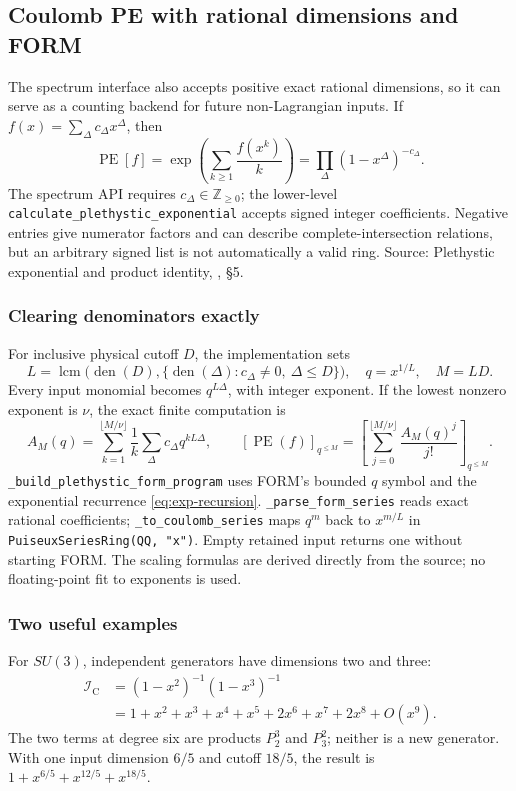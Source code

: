\documentclass[11pt,a4paper]{article}
\numberwithin{equation}{section}
\newcommand{\code}[1]{{\small\nolinkurl{#1}}}
\newcommand{\PE}{\operatorname{PE}}
\newcommand{\CB}{\mathrm C}
\newcommand{\ZZ}{\mathbb Z}
\newcommand{\src}[1]{{\small\color{muted}Source: #1.}\par}
\begin{document}
\clearpage
\subsection{Coulomb PE with rational dimensions and FORM}
The spectrum interface also accepts positive exact rational dimensions, so it
can serve as a counting backend for future non-Lagrangian inputs. If
$f(x)=\sum_\Delta c_\Delta x^\Delta$, then
\begin{equation}
 \PE[f]=\exp\!\left(\sum_{k\geq1}\frac{f(x^k)}k\right)
 =\prod_\Delta(1-x^\Delta)^{-c_\Delta}.
 \label{eq:cb-pe}
\end{equation}
The spectrum API requires $c_\Delta\in\ZZ_{\geq0}$; the lower-level
\code{calculate_plethystic_exponential} accepts signed integer coefficients.
Negative entries give numerator factors and can describe complete-intersection
relations, but an arbitrary signed list is not automatically a valid ring.
\src{Plethystic exponential and product identity, \cite{plethystics}, \S5}

\subsubsection{Clearing denominators exactly}
For inclusive physical cutoff $D$, the implementation sets
\begin{equation}
 L=\operatorname{lcm}\bigl(\operatorname{den}(D),
 \{\operatorname{den}(\Delta):c_\Delta\ne0,\ \Delta\leq D\}\bigr),
 \quad q=x^{1/L},\quad M=LD.
 \label{eq:cb-scale}
\end{equation}
Every input monomial becomes $q^{L\Delta}$, with integer exponent. If the
lowest nonzero exponent is $\nu$, the exact finite computation is
\begin{equation}
 A_M(q)=\sum_{k=1}^{\lfloor M/\nu\rfloor}\frac1k
 \sum_\Delta c_\Delta q^{kL\Delta},\qquad
 [\PE(f)]_{q^{\leq M}}=
 \left[\sum_{j=0}^{\lfloor M/\nu\rfloor}\frac{A_M(q)^j}{j!}\right]_{q^{\leq M}}.
 \label{eq:cb-finite-pe}
\end{equation}
\code{_build_plethystic_form_program} uses FORM's bounded $q$ symbol and the
exponential recurrence \eqref{eq:exp-recursion}. \code{_parse_form_series}
reads exact rational coefficients; \code{_to_coulomb_series} maps $q^m$ back to
$x^{m/L}$ in \code{PuiseuxSeriesRing(QQ, "x")}. Empty retained input returns
one without starting FORM. The scaling formulas are derived directly from
the source; no floating-point fit to exponents is used.

\subsubsection{Two useful examples}
For $SU(3)$, independent generators have dimensions two and three:
\begin{align}
 \mathcal I_\CB&=(1-x^2)^{-1}(1-x^3)^{-1}\nonumber\\
 &=1+x^2+x^3+x^4+x^5+2x^6+x^7+2x^8+O(x^9).\label{eq:su3-cb}
\end{align}
The two terms at degree six are products $P_2^3$ and $P_3^2$; neither is a new
generator. With one input dimension $6/5$ and cutoff $18/5$, the result is
$1+x^{6/5}+x^{12/5}+x^{18/5}$.
\end{document}
